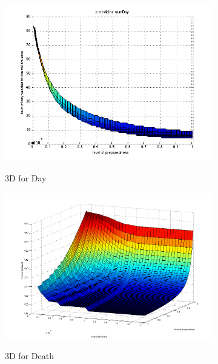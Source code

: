 \documentclass[12pt,a4paper,titlepage]{article}
\begin{document}
\begin{figure}[htbp]
\begin{subfigure}[b]{0.45\textwidth}
      	\includegraphics[width=\textwidth]{figures/imgpMedDay2.png}
      	\label{figure_3dDay2}
      	\caption{3D for Day}
  	\end{subfigure}
  	\begin{subfigure}[b]{0.45\textwidth}
      	\includegraphics[width=\textwidth]{figures/imgpMedDeath2.png}
      	\label{figure_3dDeath2}
      	\caption{3D for Death}
  	\end{subfigure}
  	\begin{subfigure}[b]{0.45\textwidth}

\end{subfigure}
\end{figure}
\end{document}
